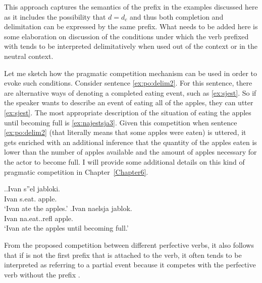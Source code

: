 This approach captures the semantics of the prefix in the examples discussed here as it includes the possibility that $d = d_c$ and thus both completion and delimitation can be expressed by the same prefix. What needs to be added here is some elaboration on discussion of the conditions under which the verb prefixed with  tends to be interpreted delimitatively when used out of the context or in the neutral context.

Let me sketch how the pragmatic competition mechanism can be used in order to evoke such conditions. Consider sentence \ref{ex:po:delim2}. For this sentence, there are alternative ways of denoting a completed eating event, such as \ref{ex:sjest}. So if the speaker wants to describe an event of eating all of the apples, they can utter \ref{ex:sjest}. The most appropriate description of the situation of eating the apples until becoming full is \ref{ex:najestsja3}. Given this competition when sentence \ref{ex:po:delim2} (that literally means that some apples were eaten) is uttered, it gets enriched with an additional inference that the quantity of the apples eaten is lower than the number of apples available and the amount of apples necessary for the actor to become full. I will provide some additional details on this kind of pragmatic competition in Chapter~\ref{Chapter6}.

\ex.\ag.\label{ex:sjest}Ivan s''el jabloki.\\
Ivan s.eat. apple.\\
\trans `Ivan ate the apples.'
\bg.\label{ex:najestsja3}Ivan naelsja jablok.\\
Ivan na.eat..refl apple.\\
\trans `Ivan ate the apples until becoming full.'

From the proposed competition between different perfective verbs, it also follows that if  is not the first prefix that is attached to the verb, it often tends to be interpreted as referring to a partial event because it competes with the perfective verb without the prefix .



